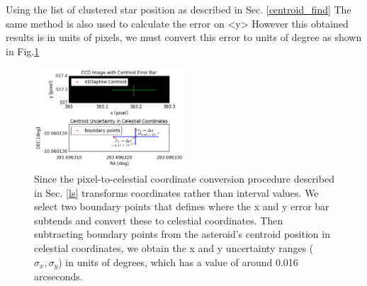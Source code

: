 \documentclass[authoryear, 12pt,5p, times]{elsarticle}
\begin{document}
Using the list of clustered star position as described in Sec. \ref{centroid_find}
The same method is also used to calculate the error on <y> 
However this obtained results is in units of pixels, we must convert this error to units of degree as shown in Fig.\ref{uncertainty_range} 
    	\begin{figure}[h!]
\includegraphics[width=0.5\textwidth]{figures/uncertainty_range}
\caption{ Since the pixel-to-celestial coordinate conversion procedure described in Sec. \ref{ls} transforms coordinates rather than interval values. We select two boundary points that defines where the x and y error bar subtends and convert these to celestial coordinates. Then subtracting boundary points from the asteroid's centroid position in celestial coordinates, we obtain the x and y uncertainty ranges ($\sigma_x,\sigma_y$) in units of degrees, which has a value of around 0.016 arcseconds.}
\label{uncertainty_range}
\end{figure}
\end{document}

